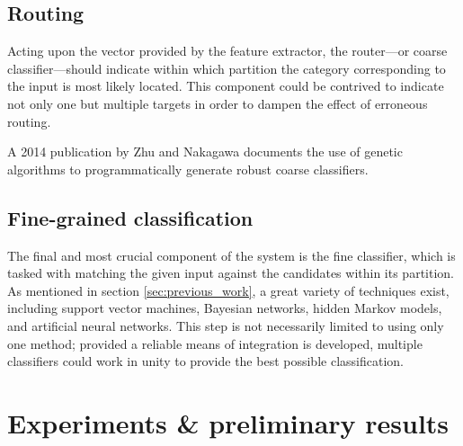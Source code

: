 \documentclass[10pt,conference,a4paper]{IEEEtran}
\begin{document}
	


	\subsection{Routing}

	Acting upon the vector provided by the feature extractor, the router---or coarse classifier---should indicate
	within which partition the category corresponding to the input is most likely located. This component could
	be contrived to indicate not only one but multiple targets in order to dampen the effect of erroneous routing.

	A 2014 publication by Zhu and Nakagawa documents the use of genetic algorithms to programmatically generate robust coarse classifiers. \cite{zhu2014robust}


	\subsection{Fine-grained classification}

	The final and most crucial component of the system is the fine classifier, which is tasked with matching the
	given input against the candidates within its partition. As mentioned in section \ref{sec:previous_work}, a great
	variety of techniques exist, including support vector machines, Bayesian networks, hidden Markov models, and artificial neural networks.
	This step is not necessarily limited to using only one method; provided a reliable means of integration is developed,
	multiple classifiers could work in unity to provide the best possible classification.



	\section{Experiments \& preliminary results}
	\label{sec:experiments}
\end{document}
